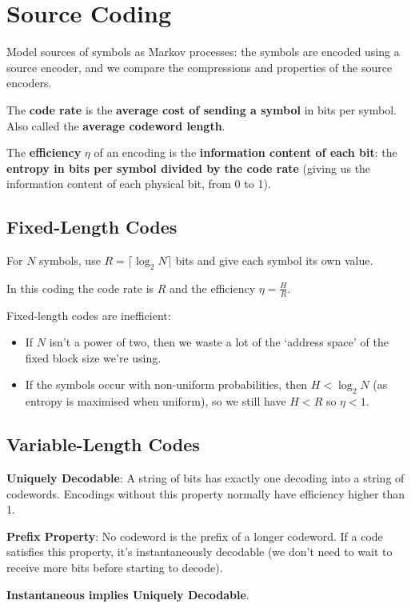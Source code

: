 \documentclass[a4paper, 11pt]{article}
\begin{document}
\section*{Source Coding}
{
    Model sources of symbols as Markov processes: the symbols are encoded using a source encoder, and we compare the compressions and properties of the source encoders.

    The \textbf{code rate} is the \textbf{average cost of sending a symbol} in bits per symbol. Also called the \textbf{average codeword length}.

    The \textbf{efficiency} \(\eta\) of an encoding is the \textbf{information content of each bit}: the \textbf{entropy in bits per symbol divided by the code rate} (giving us the information content of each physical bit, from 0 to 1).

    \subsection*{Fixed-Length Codes}
    {
        For \(N\) symbols, use \(R = \lceil \log_2{N} \rceil\) bits and give each symbol its own value.

        In this coding the code rate is \(R\) and the efficiency \(\eta = \frac{H}{R}\).

        Fixed-length codes are inefficient:
        \begin{itemize}
        \item If \(N\) isn't a power of two, then we waste a lot of the `address space' of the fixed block size we're using.
        \item If the symbols occur with non-uniform probabilities, then \(H < \log_2{N}\) (as entropy is maximised when uniform), so we still have \(H < R\) so \(\eta < 1\).
        \end{itemize}
    }
    \subsection*{Variable-Length Codes}
    {
        \textbf{Uniquely Decodable}: A string of bits has exactly one decoding into a string of codewords. Encodings without this property normally have efficiency higher than 1.

        \textbf{Prefix Property}: No codeword is the prefix of a longer codeword. If a code satisfies this property, it's instantaneously decodable (we don't need to wait to receive more bits before starting to decode).

        \textbf{Instantaneous implies Uniquely Decodable}.

}}
\end{document}
